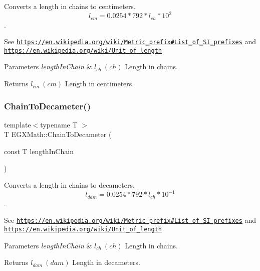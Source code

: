Converts a length in chains to centimeters. \[ l_{cm}=0.0254 * 792 * l_{ch} * 10^{2} \]. 

See \href{https://en.wikipedia.org/wiki/Metric_prefix#List_of_SI_prefixes}{\tt https\+://en.\+wikipedia.\+org/wiki/\+Metric\+\_\+prefix\#\+List\+\_\+of\+\_\+\+S\+I\+\_\+prefixes} and \href{https://en.wikipedia.org/wiki/Unit_of_length}{\tt https\+://en.\+wikipedia.\+org/wiki/\+Unit\+\_\+of\+\_\+length} 
\begin{DoxyParams}{Parameters}
{\em length\+In\+Chain} & $ l_{ch}\ (ch)$ Length in chains. \\
\hline
\end{DoxyParams}
\begin{DoxyReturn}{Returns}
$ l_{cm}\ (cm)$ Length in centimeters. 
\end{DoxyReturn}
\mbox{\label{group___e_g_x_math-_conversions-_length_conversions-_imperial-_chain-_s_i_gaabde0350f3af15795de0adeac2ec9e28}} 
\subsubsection{\texorpdfstring{Chain\+To\+Decameter()}{ChainToDecameter()}}
{\footnotesize\ttfamily template$<$typename T $>$ \\
T E\+G\+X\+Math\+::\+Chain\+To\+Decameter (\begin{DoxyParamCaption}\item[{const T}]{length\+In\+Chain }\end{DoxyParamCaption})}



Converts a length in chains to decameters. \[ l_{dam}=0.0254 * 792 * l_{ch} * 10^{-1} \]. 

See \href{https://en.wikipedia.org/wiki/Metric_prefix#List_of_SI_prefixes}{\tt https\+://en.\+wikipedia.\+org/wiki/\+Metric\+\_\+prefix\#\+List\+\_\+of\+\_\+\+S\+I\+\_\+prefixes} and \href{https://en.wikipedia.org/wiki/Unit_of_length}{\tt https\+://en.\+wikipedia.\+org/wiki/\+Unit\+\_\+of\+\_\+length} 
\begin{DoxyParams}{Parameters}
{\em length\+In\+Chain} & $ l_{ch}\ (ch)$ Length in chains. \\
\hline
\end{DoxyParams}
\begin{DoxyReturn}{Returns}
$ l_{dam}\ (dam)$ Length in decameters. 
\end{DoxyReturn}
\mbox{\label{group___e_g_x_math-_conversions-_length_conversions-_imperial-_chain-_s_i_ga9311e5452f0bd1f79f95e43085ad6412}} 
